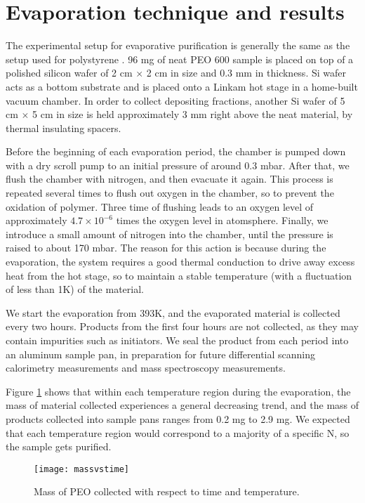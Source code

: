 \section{Evaporation technique and results}

The experimental setup for evaporative purification is generally the same as the setup used for polystyrene \cite{Zhu2017a}. 96 mg of neat PEO 600 sample is placed on top of a polished silicon wafer of 2 cm $\times$ 2 cm in size and 0.3 mm in thickness. Si wafer acts as a bottom substrate and is placed onto a Linkam hot stage in a home-built vacuum chamber. In order to collect depositing fractions, another Si wafer of 5 cm $\times$ 5 cm in size is held approximately 3 mm right above the neat material, by thermal insulating spacers.

Before the beginning of each evaporation period, the chamber is pumped down with a dry scroll pump to an initial pressure of around 0.3 mbar. After that, we flush the chamber with nitrogen, and then evacuate it again. This process is repeated several times to flush out oxygen in the chamber, so to prevent the oxidation of polymer. Three time of flushing leads to an oxygen level of approximately $4.7 \times 10^{-6}$ times the oxygen level in atomsphere. %
Finally, we introduce a small amount of nitrogen into the chamber, until the pressure is raised to about 170 mbar. The reason for this action is because during the evaporation, the system requires a good thermal conduction to drive away excess heat from the hot stage, so to maintain a stable temperature (with a fluctuation of less than 1K) of the material.

We start the evaporation from 393K, and the evaporated material is collected every two hours. Products from the first four hours are not collected, as they may contain impurities such as initiators. We seal the product from each period into an aluminum sample pan, in preparation for future differential scanning calorimetry measurements and mass spectroscopy measurements.

Figure \ref{fig:massvstime} shows that within each temperature region during the evaporation, the mass of material collected experiences a general decreasing trend, and the mass of products collected into sample pans ranges from 0.2 mg to 2.9 mg. We expected that each temperature region would correspond to a majority of a specific N, so the sample gets purified.

\begin{figure}[H]
\center
\texttt{[image: massvstime]}
\caption{Mass of PEO collected with respect to time and temperature.}
\label{fig:massvstime}
\end{figure}


